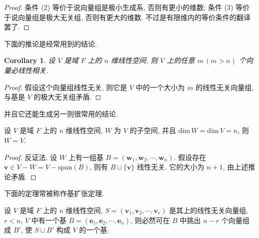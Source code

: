 \documentclass[UTF8]{book}
\newtheorem{corollary}{Corollary}[section]
\begin{document}
\begin{proof}
    条件 (2) 等价于说向量组是极小生成系, 否则有更小的维数; 
    条件 (3) 等价于说向量组是极大无关组, 否则有更大的维数. 
    不过是有限维内的等价条件的翻译罢了. 
\end{proof}

下面的推论是经常用到的结论. 

\begin{corollary}
    设 $V$ 是域 $F$ 上的 $n$ 维线性空间, 
    则 $V$ 上的任意 $m\,(m>n)$ 个向量必线性相关. 
\end{corollary}

\begin{proof}
    假设这个向量组线性无关, 则它是 $V$ 中的一个大小为 $m$ 的线性无关向量组, 
    与基是 $V$ 的极大无关组矛盾. 
\end{proof}

并且它还能生成另一则很常用的结论. 

\begin{theorem}
    设 $V$ 是域 $F$ 上的 $n$ 维线性空间, $W$ 为 $V$ 的子空间, 
    并且 $\mathrm{dim}\,W=\mathrm{dim}\,V=n$, 则 $W=V$.
\end{theorem}

\begin{proof}
    反证法. 设 $W$ 上有一组基 
    $B=(\boldsymbol{w}_1,\boldsymbol{w}_2,\cdots,\boldsymbol{w}_n)$. 
    假设存在 $\boldsymbol{v}\in V-W = V-\mathrm{span}(B)$, 
    则有 $B\sqcup \{\boldsymbol{v}\}$ 线性无关. 
    它的大小为 $n+1$, 由上述推论矛盾. 
\end{proof}

下面的定理常被称作基扩张定理. 

\begin{theorem}
    设 $V$ 是域 $F$ 上的 $n$ 维线性空间, 
    $S=(\boldsymbol{v}_1,\boldsymbol{v}_2,\cdots,\boldsymbol{v}_r)$ 
    是其上的线性无关向量组, $r<n$, $V$ 中有一个基 
    $B=(\boldsymbol{e}_1,\boldsymbol{e}_2,\cdots,\boldsymbol{e}_n)$, 
    则必然可在 $B$ 中挑出 $n-r$ 个向量组成 $B'$, 
    使 $S\sqcup B'$ 构成 $V$ 的一个基. 
\end{theorem}
\end{document}
